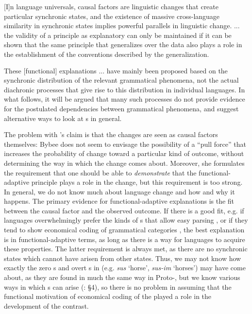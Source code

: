 \documentclass[output=paper]{langsci/langscibook}
\begin{document}
\begin{modquote}{}
[I]n language universals, causal factors are linguistic changes that create particular synchronic states, and the existence of massive cross-language similarity in synchronic states implies powerful parallels in linguistic change. ... the validity of a principle as explanatory can only be maintained if it can be shown that the same principle that generalizes over the data also plays a role in the establishment of the conventions described by the generalization. \citep[352]{Bybee1988}
\end{modquote}

\begin{modquote}
These [functional] explanations ... have mainly been proposed based on the synchronic distribution of the relevant grammatical phenomena, not the actual diachronic processes that give rise to this distribution in individual languages. In what follows, it will be argued that many such processes do not provide evidence for the postulated dependencies between grammatical phenomena, and suggest alternative ways to look at s in general. \citep[10]{Cristofaro2017}
\end{modquote}

\largerpage
The problem with ’s claim is that the changes are seen as causal factors themselves: Bybee does not seem to envisage the possibility of a “pull force” that increases the probability of change toward a particular kind of outcome, without determining the way in which the change comes about. Moreover, she formulates the requirement that one should be able to \textit{demonstrate} that the functional-adaptive principle plays a role in the change, but this requirement is too strong. In general, we do not know much about language change and how and why it happens. The primary evidence for functional-adaptive explanations is the fit between the causal factor and the observed outcome. If there is a good fit, e.g. if languages overwhelmingly prefer the kinds of s that allow easy parsing \citep{Hawkins2014_VarEff}, or if they tend to show economical coding of grammatical categories \citep{Haspelmath2008_FreqIcon}, the best explanation is in functional-adaptive terms, as long as there is a way for languages to acquire these properties. The latter requirement is always met, as there are no synchronic states which cannot have arisen from other states. Thus, we may not know how exactly the zero s and overt s in  (e.g. \textit{sus} ‘horse’, \textit{sus-im} ‘horses’) may have come about, as they are found in much the same way in Proto-, but we know various ways in which s can arise (\citealt{Cristofaro2013}: §4), so there is no problem in assuming that the functional motivation of economical coding of the  played a role in the development of the contrast.
\end{document}
